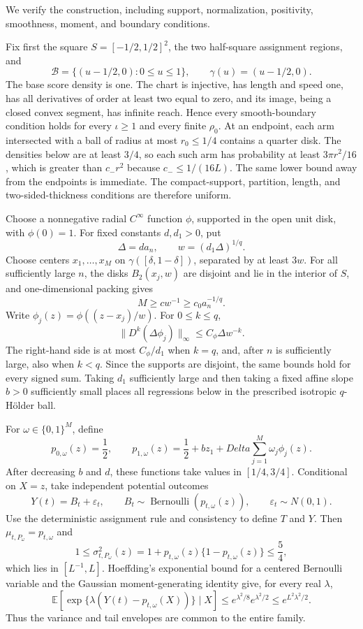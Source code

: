 We verify the construction, including support, normalization, positivity, smoothness, moment, and boundary conditions.

Fix first the square \(S=[-1/2,1/2]^2\), the two half-square assignment regions, and
\[
 \mathcal B=\{(u-1/2,0):0\leq u\leq1\},
 \qquad \gamma(u)=(u-1/2,0).
\]
The base score density is one.  The chart is injective, has length and speed one, has all derivatives of order at least two equal to zero, and its image, being a closed convex segment, has infinite reach.  Hence every smooth-boundary condition holds for every \(\iota\geq1\) and every finite \(\rho_0\).  At an endpoint, each arm intersected with a ball of radius at most \(r_0\leq1/4\) contains a quarter disk.  The densities below are at least \(3/4\), so each such arm has probability at least \(3\pi r^2/16\), which is greater than \(c_-r^2\) because \(c_-\leq1/(16L)\).  The same lower bound away from the endpoints is immediate.  The compact-support, partition, length, and two-sided-thickness conditions are therefore uniform.

Choose a nonnegative radial \(C^\infty\) function \(\phi\), supported in the open unit disk, with \(\phi(0)=1\).  For fixed constants \(d,d_1>0\), put
\[
 \Delta=d a_n,
 \qquad w=(d_1\Delta)^{1/q}.
\]
Choose centers \(x_1,\ldots,x_M\) on \(\gamma([\delta,1-\delta])\), separated by at least \(3w\).  For all sufficiently large \(n\), the disks \(B_2(x_j,w)\) are disjoint and lie in the interior of \(S\), and one-dimensional packing gives
\[
 M\geq c w^{-1}\geq c_0a_n^{-1/q}.
\]
Write \(\phi_j(z)=\phi((z-x_j)/w)\).  For \(0\leq k\leq q\),
\[
 \lVert D^k(\Delta\phi_j)\rVert_\infty
 \leq C_\phi\Delta w^{-k}.
\]
The right-hand side is at most \(C_\phi/d_1\) when \(k=q\), and, after \(n\) is sufficiently large, also when \(k<q\).  Since the supports are disjoint, the same bounds hold for every signed sum.  Taking \(d_1\) sufficiently large and then taking a fixed affine slope \(b>0\) sufficiently small places all regressions below in the prescribed isotropic \(q\)-H\"older ball.

For \(\omega\in\{0,1\}^M\), define
\[
 p_{0,\omega}(z)=\frac12,
 \qquad
 p_{1,\omega}(z)=\frac12+bz_1+Delta\sum_{j=1}^M\omega_j\phi_j(z).
\]
After decreasing \(b\) and \(d\), these functions take values in \([1/4,3/4]\).  Conditional on \(X=z\), take independent potential outcomes
\[
 Y(t)=B_t+\varepsilon_t,
 \qquad B_t\sim\operatorname{Bernoulli}(p_{t,\omega}(z)),
 \qquad \varepsilon_t\sim N(0,1).
\]
Use the deterministic assignment rule and consistency to define \(T\) and \(Y\).  Then \(\mu_{t,P_\omega}=p_{t,\omega}\) and
\[
 1\leq\sigma^2_{t,P_\omega}(z)
 =1+p_{t,\omega}(z)\{1-p_{t,\omega}(z)\}
 \leq\frac54,
\]
which lies in \([L^{-1},L]\).  Hoeffding's exponential bound for a centered Bernoulli variable and the Gaussian moment-generating identity give, for every real \(\lambda\),
\[
 \mathbb E\!\left[\exp\{\lambda(Y(t)-p_{t,\omega}(X))\}\mid X\right]
 \leq e^{\lambda^2/8}e^{\lambda^2/2}
 \leq e^{L^2\lambda^2/2}.
\]
Thus the variance and tail envelopes are common to the entire family.

